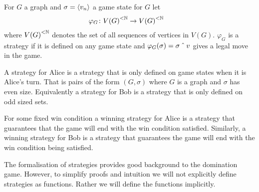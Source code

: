 \begin{definition}[Strategy]
    For $G$ a graph and $\sigma=\left\langle v_n \right\rangle$ a game state for $G$ let
    \begin{align*}        
    \varphi_G &\colon {V(G)}^{<\mathbb{N}} \to {V(G)}^{<\mathbb{N}} 
    \end{align*}
    where ${V(G)}^{<\mathbb{N}}$ denotes the set of all sequences of vertices in $V(G)$. $\varphi_G$ is a strategy if it is defined on any game state and $\varphi_G(\sigma)=\sigma\caret v$ gives a legal move in the game. 
\end{definition}
    
A strategy for Alice is a strategy that is only defined on game states when it is Alice's turn. That is pairs of the form $(G,\sigma)$ where $G$ is a graph and $\sigma$ has even size. Equivalently a strategy for Bob is a strategy that is only defined on odd sized sets. 

For some fixed win condition a winning strategy for Alice is a strategy that guarantees that the game will  end with the win condition satisfied. Similarly, a winning strategy for Bob is a strategy that guarantees the game will end with the win condition being satisfied.

The formalisation of strategies provides good background to the domination game. However, to simplify proofs and intuition we will not explicitly define strategies as functions. Rather we will define the functions implicitly.    

    
    
    
    
    
    
    
    
    
    
    
    
    
    
    
    
    
    
    